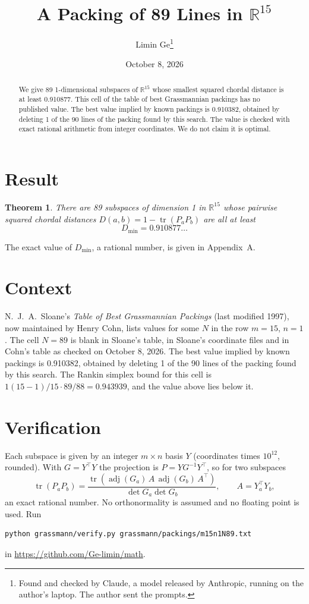 \documentclass[11pt,a4paper]{article}
\title{A Packing of 89 Lines in $\mathbb{R}^{15}$}
\author{Limin Ge\thanks{Found and checked by Claude, a model released by Anthropic, running on the author's laptop. The author sent the prompts.}}
\date{October 8, 2026}
\newtheorem*{theorem}{Theorem}
\begin{document}
\maketitle
\begin{abstract}
We give 89 1-dimensional subspaces of $\mathbb{R}^{15}$ whose smallest squared chordal distance is at least 0.910877. This cell of the table of best Grassmannian packings has no published value. The best value implied by known packings is 0.910382, obtained by deleting 1 of the 90 lines of the packing found by this search. The value is checked with exact rational arithmetic from integer coordinates. We do not claim it is optimal.
\end{abstract}

\section{Result}
\begin{theorem}
There are 89 subspaces of dimension 1 in $\mathbb{R}^{15}$ whose pairwise squared chordal distances $D(a,b) = 1 - \operatorname{tr}(P_aP_b)$ are all at least
\[ D_{\min} = 0.910877\ldots \]
\end{theorem}
The exact value of $D_{\min}$, a rational number, is given in Appendix~A.


\section{Context}
N.~J.~A.~Sloane's \emph{Table of Best Grassmannian Packings} (last modified 1997), now maintained by Henry Cohn, lists values for some $N$ in the row $m=15$, $n=1$. The cell $N=89$ is blank in Sloane's table, in Sloane's coordinate files and in Cohn's table as checked on October 8, 2026. The best value implied by known packings is 0.910382, obtained by deleting 1 of the 90 lines of the packing found by this search. The Rankin simplex bound for this cell is $1(15-1)/15\cdot 89/88 = 0.943939$, and the value above lies below it.


\section{Verification}
Each subspace is given by an integer $m\times n$ basis $Y$ (coordinates times $10^{12}$, rounded). With $G=Y^\top Y$ the projection is $P=YG^{-1}Y^\top$, so for two subspaces
\[ \operatorname{tr}(P_aP_b)=\frac{\operatorname{tr}(\operatorname{adj}(G_a)\,A\,\operatorname{adj}(G_b)\,A^\top)}{\det G_a\det G_b},\qquad A=Y_a^\top Y_b, \]
an exact rational number. No orthonormality is assumed and no floating point is used. Run
\begin{verbatim}
python grassmann/verify.py grassmann/packings/m15n1N89.txt
\end{verbatim}
in \url{https://github.com/Ge-limin/math}.
\end{document}
